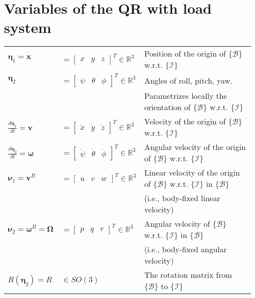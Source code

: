 \chapter{Variables of the QR with load system}\label{ch:variables}
	
\begin{tabularx}{\linewidth}{lll}
		$ \boldsymbol{\eta}_1=\mathbf{x}$&$ =\begin{bmatrix}\!x&\!\!y&\!\!z\end{bmatrix}^T\in \mathbb{R}^3 $ & Position of  the origin of $ \{\mathcal{B}\} $ w.r.t. $ \{\mathcal{I}\} $\\
		$ \boldsymbol{\eta}_2$&$= \begin{bmatrix}\!\psi &\!\!\theta &\!\!\phi\end{bmatrix}^T \in\mathbb{R}^3 $ &  Angles of roll, pitch, yaw.\\
		&&Parametrizes locally the orientation of $ \{\mathcal{B}\}  $ w.r.t. $ \{\mathcal{I}\} $\\	
		$ \frac{d\boldsymbol{\eta}_1}{dt}=\mathbf{v}$&$= \begin{bmatrix}\!\dot{x}&\!\!\dot{y}&\!\!\dot{z}\end{bmatrix}^T\in \mathbb{R}^3$ & Velocity of  the origin of $ \{\mathcal{B}\} $ w.r.t. $ \{\mathcal{I}\} $\\	
		$ \frac{d\boldsymbol{\eta}_2}{dt}={\boldsymbol{\omega}}$&$= \begin{bmatrix}\!\dot{\psi}&\!\!\dot{\theta}&\!\!\dot{\phi}\end{bmatrix}^T\in \mathbb{R}^3$ & Angular velocity of  the origin of $ \{\mathcal{B}\} $ w.r.t. $ \{\mathcal{I}\} $\\			
		$ \boldsymbol{\nu}_1=\mathbf{v}^B$&$= \begin{bmatrix}\!u&\!\! v& \!\!w\end{bmatrix}^T \in\mathbb{R}^3  $ & Linear velocity of the origin of $ \{\mathcal{B}\} $ w.r.t. $ \{\mathcal{I}\} $ in $ \{\mathcal{B}\} $\\
		&&(i.e., body-fixed linear velocity)\\
		$ \boldsymbol{\nu}_2=\boldsymbol{\omega}^B=\mathbf{\Omega}$&$= \begin{bmatrix}\!p &\!\!q&\!\! r\end{bmatrix}^T \in\mathbb{R}^3$ & Angular velocity of $ \{\mathcal{B}\}$ w.r.t. $ \{\mathcal{I}\} $ in $ \{\mathcal{B}\} $\\
		&&(i.e., body-fixed angular velocity)\\
		$ R(\boldsymbol{\eta}_2)=R$&$\in SO(3) $ & The rotation matrix from $ \{ \mathcal{B} \} $ to $ \{ \mathcal{I} \} $		\\		

\end{tabularx}
